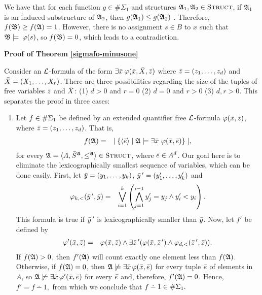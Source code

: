 We have that for each function $g \in \#\Sigma_1$ and structures $\mathfrak{A}_1,\mathfrak{A}_2\in\text{\sc Struct}$, if $\mathfrak{A}_1$ is an induced substructure of $\mathfrak{A}_2$, then $g(\mathfrak{A}_1) \leq g(\mathfrak{A}_2)$ \cite{DBLP:journals/jcss/SalujaST95}. Therefore, $f({\frak B}) \geq f(\mathfrak{A}) = 1$. However, there is no assignment $s\in B$ to $x$ such that ${\frak B}\models\:\varphi(s)$, so $f({\frak B}) = 0$, which leads to a contradiction.
	
\textbf{Proof of Theorem \ref{sigmafo-minusone}}

Consider an $\L$-formula of the form $\exists\bar{x}\:\varphi(\bar{x},\bar{X},\bar{z})$ where $\bar{z} = (z_1,\dots,z_d)$ and $\bar{X} = (X_1,\dots,X_r)$. There are three possibilities regarding the size of the tuples of free variables $\bar{z}$ and $\bar{X}$: (1) $d>0$ and $r=0$ (2) $d=0$ and $r>0$ (3) $d,r>0$. This separates the proof in three cases:
\begin{enumerate}
	\item Let $f \in \#\Sigma_{1}$ be defined by an extended quantifier free $\L$-formula $\varphi(\bar{x},\bar{z})$, where $\bar{z} = (z_1,\dots,z_d)$. That is,
	\begin{eqnarray*}
		f(\mathfrak{A}) &=& \mid \{ \langle\bar{e}\rangle \mid \mathfrak{A} \models \exists \bar{x} \ \varphi(\bar{x},\bar{e}) \} \mid,
	\end{eqnarray*}
	for every $\mathfrak{A} = \langle A, \bar{S}^{\mathfrak{A}}, \leq^{\mathfrak{A}} \rangle \in \text{\sc Struct}$, where $\bar{e} \in A^d$. Our goal here is to eliminate the lexicographically smallest sequence of variables, which can be done easily. First, let $\bar{y} = (y_1,\dots,y_k)$, $\bar{y}\,^\prime = (y_1^\prime,\dots,y_k^\prime)$ and
	\begin{eqnarray*}
		\varphi_{k,<}(\bar{y}\,^\prime,\bar{y}) &=& \bigvee_{i = 1}^k \left( \bigwedge_{j=1}^{i-1} y_j^\prime = y_j \wedge y_i^\prime < y_i \right).
	\end{eqnarray*}
	This formula is true if $\bar{y}\,^\prime$ is lexicographically smaller than $\bar{y}$. Now, let $f'$ be defined by
	\begin{eqnarray*}
		\varphi^\prime(\bar{x},\bar{z}) &=& \varphi(\bar{x},\bar{z}) \wedge \exists \bar{z}\,^\prime (\varphi(\bar{x},\bar{z}\,^\prime) \wedge \varphi_{d,<}(\bar{z}\,^\prime,\bar{z} ) ).
	\end{eqnarray*}
	If $f(\mathfrak{A})>0$, then $f'(\mathfrak{A})$ will count exactly one element less than $f(\mathfrak{A})$. Otherwise, if $f(\mathfrak{A})=0$, then $\mathfrak{A} \not\models\exists \bar{x}\,\varphi(\bar{x},\bar{e})$ for every tuple $\bar{e}$ of elements in $A$, so $\mathfrak{A} \not\models\exists \bar{x}\,\varphi^\prime(\bar{x},\bar{e})$ for every $\bar{e}$ and, therefore, $f'(\mathfrak{A})=0$. Hence, $f' = f\dotminus 1,$ from which we conclude that $f\dotminus 1\in\E{1}.$
	

\end{enumerate}
